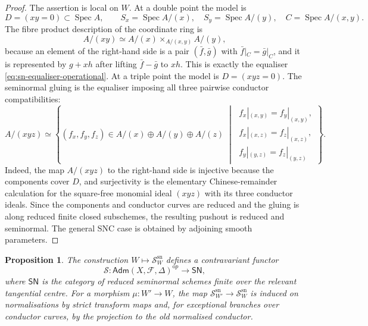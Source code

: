 \documentclass[11pt]{amsart}
\numberwithin{equation}{section}
\theoremstyle{plain}
\newtheorem{Proposition}[Theorem]{Proposition}
\theoremstyle{definition}
\newcommand{\Spec}{\operatorname{Spec}}
\newcommand{\sn}{\mathrm{sn}}
\newcommand{\Adm}{\mathsf{Adm}}
\newcommand{\SN}{\mathsf{SN}}
\newcommand{\cF}{\mathcal F}
\newcommand{\sS}{\mathscr S}
\begin{document}
\begin{proof}
The assertion is local on $W$.  At a double point the model is
\[
D=(xy=0)\subset \Spec A,
\qquad
S_x=\Spec A/(x),\quad S_y=\Spec A/(y),\quad C=\Spec A/(x,y).
\]
The fibre product description of the coordinate ring is
\[
A/(xy)\simeq A/(x)\times_{A/(x,y)}A/(y),
\]
because an element of the right-hand side is a pair $(\bar f,\bar g)$ with $\bar f|_C=\bar g|_C$, and it is represented by $g+xh$ after lifting $\bar f-\bar g$ to $xh$.  This is exactly the equaliser \eqref{eq:sn-equaliser-operational}.  At a triple point the model is $D=(xyz=0)$.  The seminormal gluing is the equaliser imposing all three pairwise conductor compatibilities:
\[
A/(xyz)\simeq
\left\{(f_x,f_y,f_z)\in A/(x)\oplus A/(y)\oplus A/(z)\;\middle|\;
\begin{array}{l}
f_x|_{(x,y)}=f_y|_{(x,y)},\\
f_x|_{(x,z)}=f_z|_{(x,z)},\\
f_y|_{(y,z)}=f_z|_{(y,z)}
\end{array}
\right\}.
\]
Indeed, the map $A/(xyz)$ to the right-hand side is injective because the components cover $D$, and surjectivity is the elementary Chinese-remainder calculation for the square-free monomial ideal $(xyz)$ with its three conductor ideals.  Since the components and conductor curves are reduced and the gluing is along reduced finite closed subschemes, the resulting pushout is reduced and seminormal.  The general SNC case is obtained by adjoining smooth parameters.
\end{proof}

\begin{Proposition}
\label{prop:separatrix-functor}
The construction
$
W\longmapsto \sS_W^{\sn}
$
defines a contravariant functor
\[
\sS:\Adm(X,\cF,\Delta)^{\mathrm op}\longrightarrow \SN,
\]
where $\SN$ is the category of reduced seminormal schemes finite over the relevant tangential centre.  For a morphism $\mu:W'\to W$, the map $\sS_{W'}^{\sn}\to\sS_W^{\sn}$ is induced on normalisations by strict transform maps and, for exceptional branches over conductor curves, by the projection to the old normalised conductor.
\end{Proposition}
\end{document}

